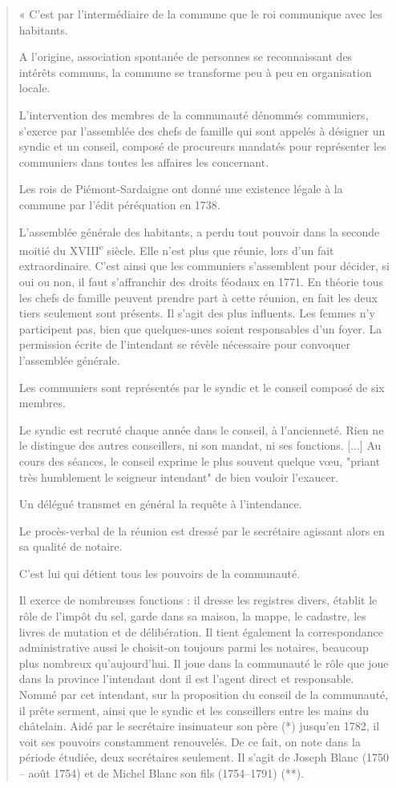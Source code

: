 \documentclass[12pt,a4paper]{report}
\begin{document}
\begin{itemize}
	\begin{quote}
	« C'est par l'intermédiaire de la commune que le roi communique avec les habitants.
	
	A l'origine, association spontanée de personnes se reconnaissant des intérêts communs, la commune se transforme peu à peu en organisation locale.
	
	L'intervention des membres de la communauté dénommés communiers, s'exerce par l'assemblée des chefs de famille qui sont appelés à désigner un syndic et un conseil, composé de procureurs mandatés pour représenter les communiers dans toutes les affaires les concernant.
	
	Les rois de Piémont-Sardaigne ont donné une existence légale à la commune par l'édit péréquation en 1738.
	
	L'assemblée générale des habitants, a perdu tout pouvoir dans la seconde moitié du XVIII\textsuperscript{e} siècle. Elle n'est plus que réunie, lors d'un fait extraordinaire. C'est ainsi que les communiers s'assemblent pour décider, si oui ou non, il faut s'affranchir des droits féodaux en 1771. En théorie tous les chefs de famille peuvent prendre part à cette réunion, en fait les deux tiers seulement sont présents. Il s'agit des plus influents. Les femmes n'y participent pas, bien que quelques-unes soient responsables d'un foyer. La permission écrite de l'intendant se révèle nécessaire pour convoquer l'assemblée générale.
	
	Les communiers sont représentés par le syndic et le conseil composé de six membres.
	
	Le syndic est recruté chaque année dans le conseil, à l'ancienneté. Rien ne le distingue des autres conseillers, ni son mandat, ni ses fonctions. 
	[...] 
	Au cours des séances, le conseil exprime le plus souvent quelque vœu, "priant très humblement le seigneur intendant" de bien vouloir l'exaucer.
	
	Un délégué transmet en général la requête à l'intendance.
	
	Le procès-verbal de la réunion est dressé par le secrétaire agissant alors en sa qualité de notaire.
	
	C'est lui qui détient tous les pouvoirs de la communauté.
	
	Il exerce de nombreuses fonctions : il dresse les registres divers, établit le rôle de l'impôt du sel, garde dans sa maison, la mappe, le cadastre, les livres de mutation et de délibération. Il tient également la correspondance administrative aussi le choisit-on toujours parmi les notaires, beaucoup plus nombreux qu'aujourd'hui. Il joue dans la communauté le rôle que joue dans la province l'intendant dont il est l'agent direct et responsable. Nommé par cet intendant, sur la proposition du conseil de la communauté, il prête serment, ainsi que le syndic et les conseillers entre les mains du châtelain. Aidé par le secrétaire insinuateur son père (*) jusqu'en 1782, il voit ses pouvoirs constamment renouvelés. De ce fait, on note dans la période étudiée, deux secrétaires seulement. Il s'agit de Joseph Blanc (1750 -- août 1754) et de Michel Blanc son fils (1754--1791) (**).
	

\end{quote}
\end{itemize}
\end{document}

